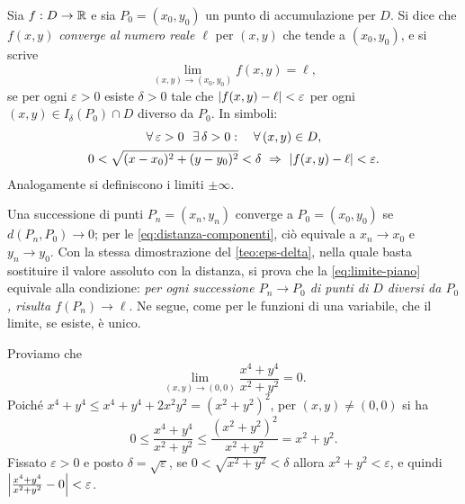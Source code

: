 \begin{definizione}\label{def:limite-piano}
Sia $f:D\to\mathbb{R}$ e sia $P_{0}=(x_{0},y_{0})$ un punto di accumulazione per $D$. Si dice
che $f(x,y)$ \emph{converge al numero reale $\ell$} per $(x,y)$ che tende a
$(x_{0},y_{0})$, e si scrive
\begin{equation}\label{eq:limite-piano}
  \lim_{(x,y)\to(x_{0},y_{0})}f(x,y)=\ell,
\end{equation}
se per ogni $\varepsilon>0$ esiste $\delta>0$ tale che $\lvert f(x,y)-\ell\rvert<\varepsilon$ per ogni
$(x,y)\in I_{\delta}(P_{0})\cap D$ diverso da $P_{0}$. In simboli:
\begin{equation}\label{eq:limite-piano-simboli}
\begin{gathered}
  \perogni\varepsilon>0\ \ \esiste\delta>0 :\quad \perogni(x,y)\in D,\\
  0<\sqrt{(x-x_{0})^{2}+(y-y_{0})^{2}}<\delta \ \implica\ \abs{f(x,y)-\ell}<\varepsilon .
\end{gathered}
\end{equation}
Analogamente si definiscono i limiti $\pm\infty$.
\end{definizione}

\begin{osservazione}\label{oss:limite-piano-successioni}
Una successione di punti $P_{n}=(x_{n},y_{n})$ converge a $P_{0}=(x_{0},y_{0})$ se
$d(P_{n},P_{0})\to0$; per le \eqref{eq:distanza-componenti}, ciò equivale a $x_{n}\to x_{0}$ e
$y_{n}\to y_{0}$. Con la stessa dimostrazione del \cref{teo:eps-delta}, nella quale basta
sostituire il valore assoluto con la distanza, si prova che la
\eqref{eq:limite-piano} equivale alla condizione: \emph{per ogni successione
$P_{n}\to P_{0}$ di punti di $D$ diversi da $P_{0}$, risulta $f(P_{n})\to\ell$}. Ne segue,
come per le funzioni di una variabile, che il limite, se esiste, è unico.
\end{osservazione}

\begin{esempio}\label{es:limite-x4-y4}
Proviamo che
\begin{equation}\label{eq:limite-x4-y4}
  \lim_{(x,y)\to(0,0)}\frac{x^{4}+y^{4}}{x^{2}+y^{2}}=0 .
\end{equation}
Poiché $x^{4}+y^{4}\le x^{4}+y^{4}+2x^{2}y^{2}=(x^{2}+y^{2})^{2}$, per $(x,y)\neq(0,0)$ si ha
\[
  0\le\frac{x^{4}+y^{4}}{x^{2}+y^{2}}\le\frac{(x^{2}+y^{2})^{2}}{x^{2}+y^{2}}=x^{2}+y^{2} .
\]
Fissato $\varepsilon>0$ e posto $\delta=\sqrt\varepsilon$, se $0<\sqrt{x^{2}+y^{2}}<\delta$ allora
$x^{2}+y^{2}<\varepsilon$, e quindi $\Bigl|\frac{x^{4}+y^{4}}{x^{2}+y^{2}}-0\Bigr|<\varepsilon$.
\end{esempio}

